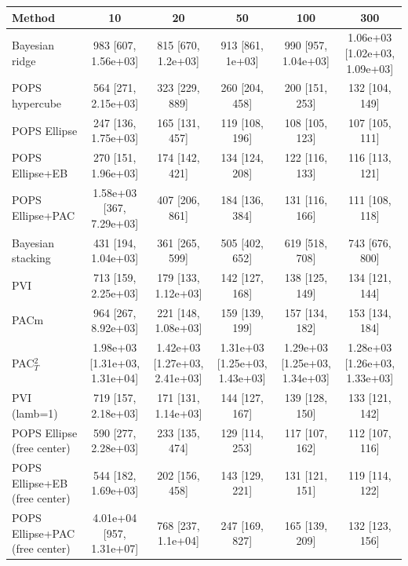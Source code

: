 \begin{tabular}{lccccc}
\toprule
Method & 10 & 20 & 50 & 100 & 300 \\
\midrule
Bayesian ridge & 983 {\scriptsize[607, 1.56e+03]} & 815 {\scriptsize[670, 1.2e+03]} & 913 {\scriptsize[861, 1e+03]} & 990 {\scriptsize[957, 1.04e+03]} & 1.06e+03 {\scriptsize[1.02e+03, 1.09e+03]} \\
POPS hypercube & 564 {\scriptsize[271, 2.15e+03]} & 323 {\scriptsize[229, 889]} & 260 {\scriptsize[204, 458]} & 200 {\scriptsize[151, 253]} & 132 {\scriptsize[104, 149]} \\
POPS Ellipse & 247 {\scriptsize[136, 1.75e+03]} & 165 {\scriptsize[131, 457]} & 119 {\scriptsize[108, 196]} & 108 {\scriptsize[105, 123]} & 107 {\scriptsize[105, 111]} \\
POPS Ellipse+EB & 270 {\scriptsize[151, 1.96e+03]} & 174 {\scriptsize[142, 421]} & 134 {\scriptsize[124, 208]} & 122 {\scriptsize[116, 133]} & 116 {\scriptsize[113, 121]} \\
POPS Ellipse+PAC & 1.58e+03 {\scriptsize[367, 7.29e+03]} & 407 {\scriptsize[206, 861]} & 184 {\scriptsize[136, 384]} & 131 {\scriptsize[116, 166]} & 111 {\scriptsize[108, 118]} \\
Bayesian stacking & 431 {\scriptsize[194, 1.04e+03]} & 361 {\scriptsize[265, 599]} & 505 {\scriptsize[402, 652]} & 619 {\scriptsize[518, 708]} & 743 {\scriptsize[676, 800]} \\
PVI & 713 {\scriptsize[159, 2.25e+03]} & 179 {\scriptsize[133, 1.12e+03]} & 142 {\scriptsize[127, 168]} & 138 {\scriptsize[125, 149]} & 134 {\scriptsize[121, 144]} \\
PACm & 964 {\scriptsize[267, 8.92e+03]} & 221 {\scriptsize[148, 1.08e+03]} & 159 {\scriptsize[139, 199]} & 157 {\scriptsize[134, 182]} & 153 {\scriptsize[134, 184]} \\
PAC$^2_T$ & 1.98e+03 {\scriptsize[1.31e+03, 1.31e+04]} & 1.42e+03 {\scriptsize[1.27e+03, 2.41e+03]} & 1.31e+03 {\scriptsize[1.25e+03, 1.43e+03]} & 1.29e+03 {\scriptsize[1.25e+03, 1.34e+03]} & 1.28e+03 {\scriptsize[1.26e+03, 1.33e+03]} \\
PVI (lamb=1) & 719 {\scriptsize[157, 2.18e+03]} & 171 {\scriptsize[131, 1.14e+03]} & 144 {\scriptsize[127, 167]} & 139 {\scriptsize[128, 150]} & 133 {\scriptsize[121, 142]} \\
POPS Ellipse (free center) & 590 {\scriptsize[277, 2.28e+03]} & 233 {\scriptsize[135, 474]} & 129 {\scriptsize[114, 253]} & 117 {\scriptsize[107, 162]} & 112 {\scriptsize[107, 116]} \\
POPS Ellipse+EB (free center) & 544 {\scriptsize[182, 1.69e+03]} & 202 {\scriptsize[156, 458]} & 143 {\scriptsize[129, 221]} & 131 {\scriptsize[121, 151]} & 119 {\scriptsize[114, 122]} \\
POPS Ellipse+PAC (free center) & 4.01e+04 {\scriptsize[957, 1.31e+07]} & 768 {\scriptsize[237, 1.1e+04]} & 247 {\scriptsize[169, 827]} & 165 {\scriptsize[139, 209]} & 132 {\scriptsize[123, 156]} \\
\bottomrule
\end{tabular}

